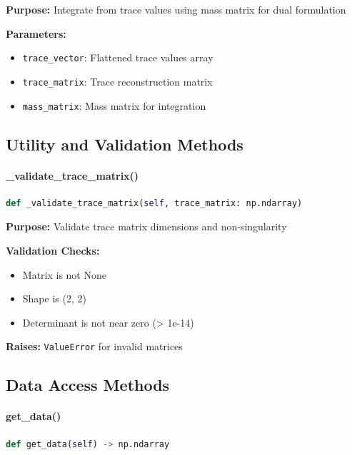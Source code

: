 \textbf{Purpose:} Integrate from trace values using mass matrix for dual formulation

\textbf{Parameters:}
\begin{itemize}
    \item \texttt{trace\_vector}: Flattened trace values array
    \item \texttt{trace\_matrix}: Trace reconstruction matrix
    \item \texttt{mass\_matrix}: Mass matrix for integration
\end{itemize}



\subsection{Utility and Validation Methods}
\label{subsec:utility_methods}

\paragraph{\_validate\_trace\_matrix()}\leavevmode
\begin{lstlisting}[language=Python, caption=Trace Matrix Validation Method]
def _validate_trace_matrix(self, trace_matrix: np.ndarray)
\end{lstlisting}

\textbf{Purpose:} Validate trace matrix dimensions and non-singularity

\textbf{Validation Checks:}
\begin{itemize}
    \item Matrix is not None
    \item Shape is (2, 2)
    \item Determinant is not near zero (> 1e-14)
\end{itemize}

\textbf{Raises:} \texttt{ValueError} for invalid matrices

\subsection{Data Access Methods}
\label{subsec:data_access_methods}

\paragraph{get\_data()}\leavevmode
\begin{lstlisting}[language=Python, caption=Get Data Method]
def get_data(self) -> np.ndarray
\end{lstlisting}

